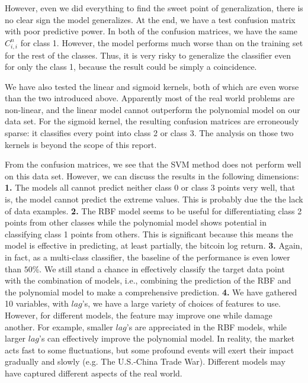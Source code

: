 \documentclass[9pt,twocolumn,twoside]{ilcss}
\begin{document}
However, even we did everything to find the sweet point of generalization, there is no clear sign the model generalizes. At the end, we have a test confusion matrix with poor predictive power. In both of the confusion matrices, we have the same $C_{i,i}^n$ for class 1. However, the model performs much worse than on the training set for the rest of the classes. Thus, it is very risky to generalize the classifier even for only the class 1, because the result could be simply a coincidence.

We have also tested the linear and sigmoid kernels, both of which are even worse than the two introduced above. Apparently most of the real world problems are non-linear, and the linear model cannot outperform the polynomial model on our data set. For the sigmoid kernel, the resulting confusion matrices are erroneously sparse: it classifies every point into class 2 or class 3. The analysis on those two kernels is beyond the scope of this report.

From the confusion matrices, we see that the SVM method does not perform well on this data set. However, we can discuss the results in the following dimensions: \textbf{1.} The models all cannot predict neither class 0 or class 3 points very well, that is, the model cannot predict the extreme values. This is probably due the the lack of data examples. \textbf{2.} The RBF model seems to be useful for differentiating class 2 points from other classes while the polynomial model shows potential in classifying class 1 points from others. This is significant because this means the model is effective in predicting, at least partially, the bitcoin log return. \textbf{3.} Again, in fact, as a multi-class classifier, the baseline of the performance is even lower than $50\%$. We still stand a chance in effectively classify the target data point with the combination of models, i.e., combining the prediction of the RBF and the polynomial model to make a comprehensive prediction. \textbf{4.} We have gathered 10 variables, with $lag$'s, we have a large variety of choices of features to use. However, for different models, the feature may improve one while damage another. For example, smaller $lag$'s are appreciated in the RBF models, while larger $lag$'s can effectively improve the polynomial model. In reality, the market acts fast to some fluctuations, but some profound events will exert their impact gradually and slowly (e.g. The U.S.-China Trade War). Different models may have captured different aspects of the real world.
\end{document}
